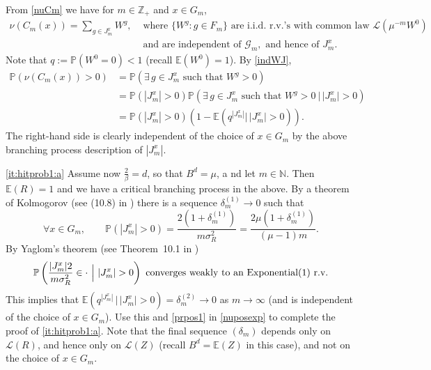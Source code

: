 \documentclass[12pt]{article}
\makeatletter
\renewenvironment{proof}[1][\proofname]{%
\par\pushQED{\qed}\normalfont%
\topsep6\p@\@plus6\p@\relax
\trivlist\item[\hskip\labelsep\bfseries#1\@addpunct{.}]%
\ignorespaces
}{%
\popQED\endtrivlist\@endpefalse
}
\numberwithin{theorem}{section}
\theoremstyle{def}
\numberwithin{equation}{section}
\renewcommand{\P}{\mathbb{P}}
\newcommand{\E}{\mathbb{E}}
\newcommand{\Z}{\mathbb{Z}}
\newcommand{\N}{\mathbb{N}}
\newcommand{\cG}{\mathcal G}
\newcommand{\cL}{\mathcal{L}}
\makeatother
\begin{document}
\begin{proof}
From \eqref{nuCm} we have for $m\in\Z_+$ and $x\in G_m$,
\begin{align}\label{indWJ}
\nonumber\nu(C_m(x))=\sum_{g\in J^x_m}W^g,&
\text{ where }
\{W^g:g\in F_m\}\text{ are i.i.d.\ r.v.'s with common law $\cL(\mu^{-m}W^0)$}\\
&\text{ and are independent of }\cG_m,
\text{ and hence of }J^x_m.
\end{align}
Note that $q:=\P(W^0=0)<1$ (recall $\E(W^0)=1$).  By \eqref{indWJ},
\begin{align}\label{nuposexp}
\nonumber \P(\nu(C_m(x))>0)&=\P(\exists\, g\in J^x_m \text{ such that }W^g>0)\\
\nonumber&=\P(|J^x_m|>0)\P(\exists\, g\in J^x_m\text{ such that }W^g>0 \ |\, |J^x_m|>0)\\
&=\P(|J^x_m|>0)(1-\E(q^{|J^x_m|}|\,|J^x_m|>0)).
\end{align}
The right-hand side is clearly independent of the choice of $x\in G_m$ by the above branching process description of $|J^x_m|$.

\ref{it:hitprob1:a} Assume now $\frac{2}{\beta}=d$, so that $B^d=\mu$, a	nd let $m\in\N$. 
Then $\E(R)=1$ and we have a critical branching process in the above.  
By a theorem of Kolmogorov (see (10.8) in \cite{Har}) there is a sequence $\delta^{(1)}_m\to 0$ such that 
\begin{equation}\label{prpos1}
\forall x\in G_m,\qquad \P(|J^x_m|>0)=\frac{2(1+\delta^{(1)}_m)}{m\sigma_R^2}=\frac{2\mu(1+\delta_m^{(1)})}{(\mu-1)m}.
\end{equation}
By Yaglom's theorem (see Theorem~10.1 in \cite{Har}) 
\begin{equation*}
\P\left(\frac{|J^x_m|2}{m\sigma^2_R}\in\cdot \ \Bigl| \ |J^x_m|>0\right)\text{ converges weakly to an $\text{Exponential}(1)$ r.v.}
\end{equation*}
This implies that $\E(q^{|J^x_m|} \, | \, |J^x_m|>0)=\delta^{(2)}_m\to 0$ as $m\to\infty$ (and is independent of the choice of $x\in G_m$). 
Use this and \eqref{prpos1} in \eqref{nuposexp} to complete the proof of \ref{it:hitprob1:a}. 
Note that the final sequence $(\delta_m)$ depends only on $\cL(R)$, and hence only on $\cL(Z)$ (recall $B^d=\E(Z)$ in this case), and not on the choice of $x\in G_m$. 


\end{proof}
\end{document}
